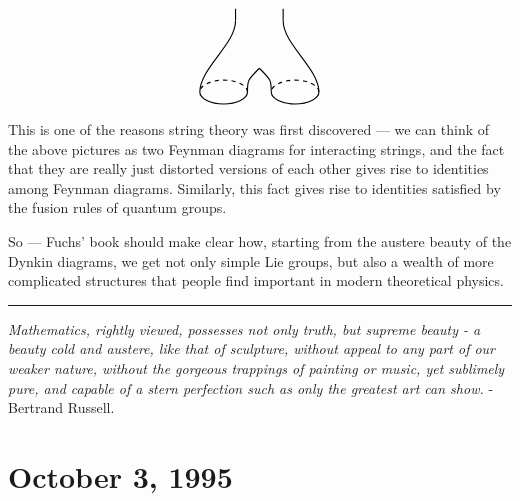 \documentclass{article}
\begin{document}
\begin{enumerate}
\[\begin{tikzpicture}[scale=0.3]
\begin{scope}
       \end{scope}
       \begin{scope}[rotate=180,shift={(0,14)}]
         \begin{scope}[shift={(-3,0)},rotate=180]
           \draw[thick,dashed] (0:2) arc (0:180:2cm and 1cm);
           \draw[thick] (180:2) arc (180:360:2cm and 1cm);
         \end{scope}
         \begin{scope}[shift={(3,0)},rotate=180]
           \draw[thick,dashed] (0:2) arc (0:180:2cm and 1cm);
           \draw[thick] (180:2) arc (180:360:2cm and 1cm);
         \end{scope}
         \draw[thick] (-5,0) .. controls (-5,-2) and (-2,-4) .. (-2,-6);
         \draw[thick] (5,0) .. controls (5,-2) and (2,-4) .. (2,-6);
         \draw[thick] (-1,0) .. controls (-1,-1) .. (0,-2);
         \draw[thick] (1,0) .. controls (1,-1) .. (0,-2);
         \draw[thick] (-2,-6) to (-2,-7);
         \draw[thick] (2,-6) to (2,-7);
       \end{scope}
     \end{tikzpicture}
   \] This is one of the reasons string theory was first discovered ---
  we can think of the above pictures as two Feynman diagrams for
  interacting strings, and the fact that they are really just distorted
  versions of each other gives rise to identities among Feynman
  diagrams. Similarly, this fact gives rise to identities satisfied by
  the fusion rules of quantum groups.
\end{enumerate}

So --- Fuchs' book should make clear how, starting from the austere
beauty of the Dynkin diagrams, we get not only simple Lie groups, but
also a wealth of more complicated structures that people find important
in modern theoretical physics.

\begin{center}\rule{0.5\linewidth}{0.5pt}\end{center}

\emph{Mathematics, rightly viewed, possesses not only truth, but supreme
beauty - a beauty cold and austere, like that of sculpture, without
appeal to any part of our weaker nature, without the gorgeous trappings
of painting or music, yet sublimely pure, and capable of a stern
perfection such as only the greatest art can show.} - Bertrand Russell.



\hypertarget{week65}{%
\section{October 3, 1995}\label{week65}}
\end{document}
